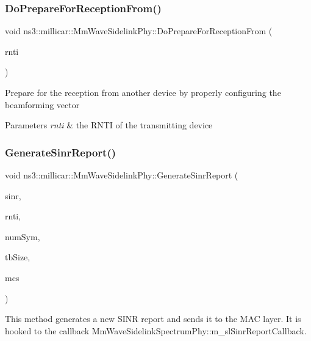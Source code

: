 \subsubsection{\texorpdfstring{Do\+Prepare\+For\+Reception\+From()}{DoPrepareForReceptionFrom()}}
{\footnotesize\ttfamily void ns3\+::millicar\+::\+Mm\+Wave\+Sidelink\+Phy\+::\+Do\+Prepare\+For\+Reception\+From (\begin{DoxyParamCaption}\item[{uint16\+\_\+t}]{rnti }\end{DoxyParamCaption})}

Prepare for the reception from another device by properly configuring the beamforming vector 
\begin{DoxyParams}{Parameters}
{\em rnti} & the R\+N\+TI of the transmitting device \\
\hline
\end{DoxyParams}
\mbox{\label{classns3_1_1millicar_1_1MmWaveSidelinkPhy_aa58a85f3e170a5ede36af9eb16604460}} 
\subsubsection{\texorpdfstring{Generate\+Sinr\+Report()}{GenerateSinrReport()}}
{\footnotesize\ttfamily void ns3\+::millicar\+::\+Mm\+Wave\+Sidelink\+Phy\+::\+Generate\+Sinr\+Report (\begin{DoxyParamCaption}\item[{const Spectrum\+Value \&}]{sinr,  }\item[{uint16\+\_\+t}]{rnti,  }\item[{uint8\+\_\+t}]{num\+Sym,  }\item[{uint32\+\_\+t}]{tb\+Size,  }\item[{uint8\+\_\+t}]{mcs }\end{DoxyParamCaption})}



This method generates a new S\+I\+NR report and sends it to the M\+AC layer. It is hooked to the callback Mm\+Wave\+Sidelink\+Spectrum\+Phy\+::m\+\_\+sl\+Sinr\+Report\+Callback. 


